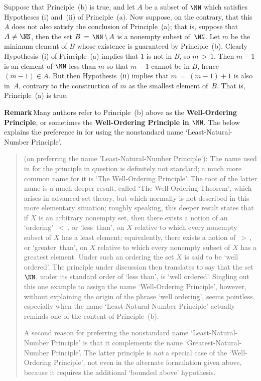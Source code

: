         Suppose that Principle~(b) is true, and let $A$ be a subset of ${\NN}$ which satisfies Hypotheses (i) and~(ii) of Principle~(a).
    Now suppose, on the contrary, that this $A$ does not also satisfy the conclusion of Principle~(a); that is, suppose that $A \,\,{\neq}\,\, {\NN}$,
    then the set $B \,=\, {\NN}\,{\setminus}\,A$ is a nonempty subset of~${\NN}$. Let $m$ be the minimum element of $B$ whose existence is guaranteed by Principle~(b).
    Clearly Hypothesis~(i) of Principle~(a) implies that $1$ is not in $B$, so $m\,>\,1$. Then $m-1$ is an element of ${\NN}$ less than $m$ so that $m-1$ cannot be in $B$, hence $(m-1){\in}A$.
    But then Hypothesis~(ii) implies that $m \,=\, (m-1)+1$ is also in~$A$, contrary to the construction of $m$ as the smallest element of~$B$. That is, Principle~(a) is true.

\V

        {\bf Remark}\,Many authors refer to Principle~(b) above as the
    {\bf Well-Ordering Principle}, or sometimes the {\bf Well-Ordering Principle in ${\NN}$}.
    The {\Note} below explains the preference in {\TheseNotes} for using the nonstandard name `Least-Natural-Number Principle'.


\VV


\begin{quotation}
{\footnotesize \underline{\Note} (on preferring the name 'Least-Natural-Number Principle'):
        The name used in {\ThisText} for the principle in question is definitely not standard; a much more common name for it is `The Well-Ordering Principle'.
    The root of the latter name is a much deeper result, called `The Well-Ordering Theorem', which arises in advanced set theory, but which normally is not described in this more elementary situation;
    roughly speaking, this deeper result states that if $X$ is an arbitrary nonempty set, then there exists a notion of an `ordering' $\,<\,$.
    or `less~than', on $X$ relative to which every nonempty subset of $X$ has a least element;
equivalently,
    there exists a notion of $\,>\,$, or `greater~than', on $X$ relative to which every nonempty subset of $X$ has a greatest element.
    Under such an ordering the set $X$ is said to be `well ordered'. The principle under discussion then translates to say that the set ${\NN}$,
    under its standard order of `less than', is `well ordered'. Singling out this one example to assign the name `Well-Ordering Principle',
    however, without explaining the origin of the phrase `well ordering', seems pointless, especially when the name `Least-Natural-Number Principle' actually reminds one of the content of Principle~(b).

        A second reason for preferring the nonstandard name `Least-Natural-Number Principle'
    is that it complements the name `Greatest-Natural-Number Principle'. The latter principle is {\em not} a special case of the `Well-Ordering Principle',
    not even in the alternate formulation given above, because it requires the additional `bounded above' hypothesis.
}%
\end{quotation}

